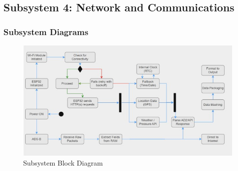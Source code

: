 \clearpage
\subsection{Subsystem 4: Network and Communications}

\subsubsection{Subsystem Diagrams}
\begin{figure}[h]
    \centering
    \includegraphics[width=16cm]{images/Communications/SubsystemDiagram-communcations.jpg} %
    \caption{Subsystem Block Diagram}
\end{figure} %

